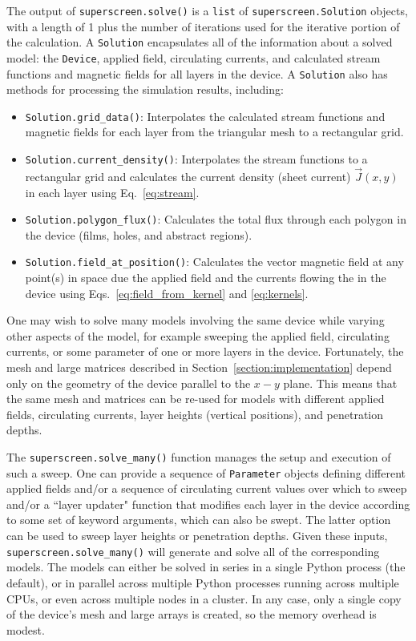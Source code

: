 \documentclass[preprint,12pt]{elsarticle}
\begin{document}
The output of \texttt{superscreen.solve()} is a \texttt{list} of \texttt{superscreen.Solution} objects, with a length of 1 plus the number of iterations used for the iterative portion of the calculation. A \texttt{Solution} encapsulates all of the information about a solved model: the \texttt{Device}, applied field, circulating currents, and calculated stream functions and magnetic fields for all layers in the device. A \texttt{Solution} also has methods for processing the simulation results, including:
\begin{itemize}
    \item{
    \texttt{Solution.grid_data()}: Interpolates the calculated stream functions and magnetic fields for each layer from the triangular mesh to a rectangular grid.
    }
    \item{
    \texttt{Solution.current_density()}: Interpolates the stream functions to a rectangular grid and calculates the current density (sheet current) $\vec{J}(x, y)$ in each layer using Eq.~\ref{eq:stream}.
    }
    \item{
    \texttt{Solution.polygon_flux()}: Calculates the total flux through each polygon in the device (films, holes, and abstract regions).
    }
    \item{
    \texttt{Solution.field_at_position()}: Calculates the vector magnetic field at any point(s) in space due the applied field and the currents flowing the in the device using Eqs.~\ref{eq:field_from_kernel} and \ref{eq:kernels}.
    }
\end{itemize}

One may wish to solve many models involving the same device while varying other aspects of the model, for example sweeping the applied field, circulating currents, or some parameter of one or more layers in the device. Fortunately, the mesh and large matrices described in Section~\ref{section:implementation} depend only on the geometry of the device parallel to the $x-y$ plane. This means that the same mesh and matrices can be re-used for models with different applied fields, circulating currents, layer heights (vertical positions), and penetration depths.

The \texttt{superscreen.solve_many()} function manages the setup and execution of such a sweep. One can provide a sequence of \texttt{Parameter} objects defining different applied fields and/or a sequence of circulating current values over which to sweep and/or a ``layer updater" function that modifies each layer in the device according to some set of keyword arguments, which can also be swept. The latter option can be used to sweep layer heights or penetration depths. Given these inputs, \texttt{superscreen.solve_many()} will generate and solve all of the corresponding models. The models can either be solved in series in a single Python process (the default), or in parallel across multiple Python processes running across multiple CPUs, or even across multiple nodes in a cluster. In any case, only a single copy of the device's mesh and large arrays is created, so the memory overhead is modest.
\end{document}
